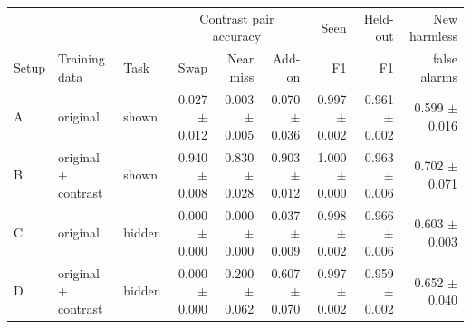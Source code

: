 \begin{tabular}{lllrrrrrr}
\toprule
 & & & \multicolumn{3}{c}{Contrast pair accuracy} & Seen & Held-out & New harmless \\
Setup & Training data & Task & Swap & Near miss & Add-on & F1 & F1 & false alarms \\
\midrule
A & original & shown & 0.027 $\pm$ 0.012 & 0.003 $\pm$ 0.005 & 0.070 $\pm$ 0.036 & 0.997 $\pm$ 0.002 & 0.961 $\pm$ 0.002 & 0.599 $\pm$ 0.016 \\
B & original + contrast & shown & 0.940 $\pm$ 0.008 & 0.830 $\pm$ 0.028 & 0.903 $\pm$ 0.012 & 1.000 $\pm$ 0.000 & 0.963 $\pm$ 0.006 & 0.702 $\pm$ 0.071 \\
C & original & hidden & 0.000 $\pm$ 0.000 & 0.000 $\pm$ 0.000 & 0.037 $\pm$ 0.009 & 0.998 $\pm$ 0.002 & 0.966 $\pm$ 0.006 & 0.603 $\pm$ 0.003 \\
D & original + contrast & hidden & 0.000 $\pm$ 0.000 & 0.200 $\pm$ 0.062 & 0.607 $\pm$ 0.070 & 0.997 $\pm$ 0.002 & 0.959 $\pm$ 0.002 & 0.652 $\pm$ 0.040 \\
\bottomrule
\end{tabular}
